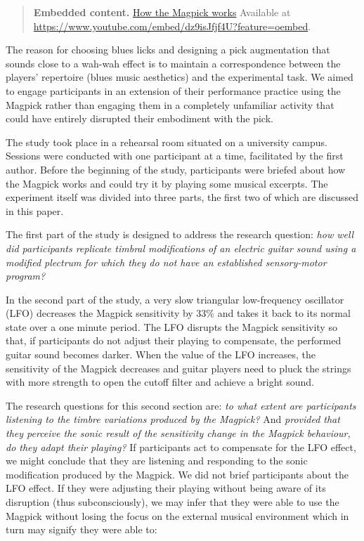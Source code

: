 \documentclass[sigconf]{nimeart}
\begin{document}
\begin{quote}\small\textbf{Embedded content.} \href{https://www.youtube.com/embed/dz9isJfjf4U?feature=oembed}{How the Magpick works} Available at \url{https://www.youtube.com/embed/dz9isJfjf4U?feature=oembed}.\end{quote}


The reason for choosing blues licks and designing a pick augmentation that sounds close to a wah-wah effect is to maintain a correspondence between the players' repertoire (blues music aesthetics) and the experimental task. We aimed to engage participants in an extension of their performance practice using the Magpick rather than engaging them in a completely unfamiliar activity that could have entirely disrupted their embodiment with the pick.

The study took place in a rehearsal room situated on a university campus. Sessions were conducted with one participant at a time, facilitated by the first author. Before the beginning of the study, participants were briefed about how the Magpick works and could try it by playing some musical excerpts. The experiment itself was divided into three parts, the first two of which are discussed in this paper.

The first part of the study is designed to address the research question: \emph{how well did participants replicate timbral modifications of an electric guitar sound using a modified plectrum for which they do not have an established sensory-motor program?}

In the second part of the study, a very slow triangular low-frequency oscillator (LFO) decreases the Magpick sensitivity by 33\% and takes it back to its normal state over a one minute period\emph{.} The LFO disrupts the Magpick sensitivity so that, if participants do not adjust their playing to compensate, the performed guitar sound becomes darker. When the value of the LFO increases, the sensitivity of the Magpick decreases and guitar players need to pluck the strings with more strength to open the cutoff filter and achieve a bright sound.

The research questions for this second section are: \emph{to what extent are participants listening to the timbre variations produced by the Magpick?} And \emph{provided that they perceive the sonic result of the sensitivity change in the Magpick behaviour, do they adapt their playing?} If participants act to compensate for the LFO effect, we might conclude that they are listening and responding to the sonic modification produced by the Magpick. We did not brief participants about the LFO effect. If they were adjusting their playing without being aware of its disruption (thus subconsciously), we may infer that they were able to use the Magpick without losing the focus on the external musical environment which in turn may signify they were able to:
\end{document}
